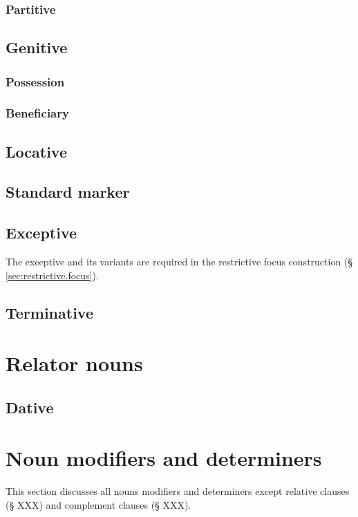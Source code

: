\subsubsection{Partitive}

\subsection{Genitive} \label{sec:genitive}
\subsubsection{Possession}
\subsubsection{Beneficiary}
\subsection{Locative}
\subsection{Standard marker} \label{sec:comparative} %
\subsection{Exceptive} \label{sec:exceptive} %

The exceptive  and its variants are required in the restrictive focus construction (§ \ref{sec:restrictive.focus}).

\subsection{Terminative} \label{sec:terminative}  %

\section{Relator nouns}
\subsection{Dative} \label{sec:dative} 

\section{Noun modifiers and determiners}
This section discusses all nouns modifiers and determiners except relative clauses (§ XXX) and complement clauses (§ XXX). 


